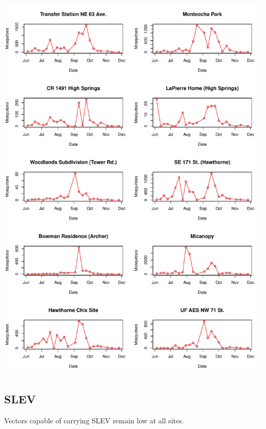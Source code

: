 \documentclass{article}
\begin{document}
\begin{center}
\includegraphics{mosq08nov13-008}
\newpage
\subsection*{SLEV}

\end{center}

Vectors capable of carrying SLEV remain low at all sites.\\
\end{document}
